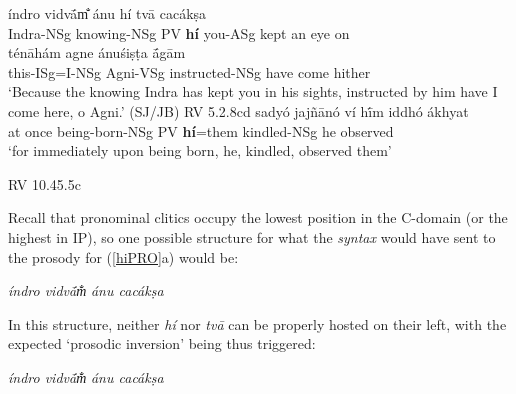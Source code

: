\documentclass[output=paper,
modfonts
]{LSP/langsci}
\begin{document}
\begin{exe}
\ex\label{hiPRO}
	\begin{xlist}
	\ex\gll índro vidvā́m̐ ánu hí tvā cacákṣa \\
			Indra-NSg knowing-NSg PV \textbf{hí} you-ASg {kept an eye on} \\
				
		\gll ténāhám agne ánuśiṣṭa ā́gām \\
			 this-ISg=I-NSg Agni-VSg instructed-NSg {have come hither} \\
		\glt `Because the knowing Indra has kept you in his sights, instructed by him have I come here, o Agni.' (SJ/JB) \hfill {RV 5.2.8cd}
	\ex\gll sadyó jajñānó ví hī́m iddhó ákhyat \\
			{at once} being-born-NSg PV \textbf{hí}=them kindled-NSg {he observed} \\
		\glt `for immediately upon being born, he, kindled, observed them'
		
		\hfill {RV 10.45.5c}
	\end{xlist}
\end{exe}

\noindent Recall that pronominal clitics occupy the lowest position in the C-domain (or the highest in IP), so one possible structure for what the \textit{syntax} would
have sent to the prosody for (\ref{hiPRO}a) would be:


\begin{exe}
\ex\label{outsidein}
{\ob} \textit{índro vidvā́m̐}{\cb} {\ob} {\textit{}} {\ob}{} {\ob}\textit{ánu cacákṣa}{\cb}{\cb}{\cb}
\end{exe}

\noindent In this structure, neither \textit{hí} nor \textit{tvā} can be properly hosted on their left, with the expected
`prosodic inversion' being thus triggered:

\vspace*{2ex}
\begin{exe}\ex
{\ob} \textit{índro vidvā́m̐}{\cb} {\ob} {\textcolor{gray}{\textit{}}} {\ob}{\textcolor{gray}{}} {\ob}\textit{ánu   cacákṣa}{\cb}{\cb}{\cb}  
\end{exe}
\vspace*{1ex}
\end{document}
